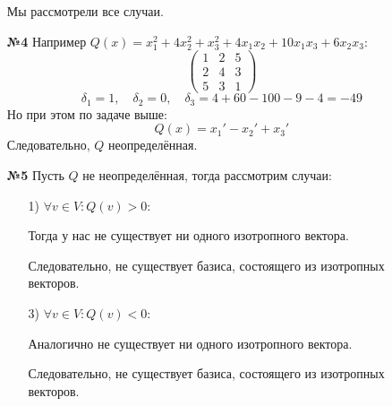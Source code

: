 \documentclass[a4paper]{article}
\newcommand{\mat}[1]{\begin{pmatrix} #1 \end{pmatrix}}
\begin{document}
\begin{enumerate}
    Мы рассмотрели все случаи.

    \item[\textbf{№4}]Например $Q(x) = x_1^2 + 4x_2^2 + x_3^2 + 4 x_1x_2 + 10x_1x_3 + 6x_2x_3$:
    $$\mat{
        1 & 2 & 5 \\
        2 & 4 & 3\\
        5 & 3 & 1
    }$$
    $$\delta_1 = 1, \quad \delta_2 = 0, \quad \delta_3 = 4+60-100-9-4 = -49$$
    Но при этом по задаче выше:
    $$Q(x) = x_1' -x_2'+x_3'$$
    Следовательно, $Q$ неопределённая.

    \item[\textbf{№5}]Пусть $Q$ не неопределённая, тогда рассмотрим случаи:
    \begin{enumerate}
        \item[1)] $\forall v \in V: Q(v) > 0$:
        
        Тогда у нас не существует ни одного изотропного вектора.

        Следовательно, не существует базиса, состоящего из изотропных векторов.


        \item[3)] $\forall v \in V: Q(v) < 0$:
        
        Аналогично не существует ни одного изотропного вектора.

        Следовательно, не существует базиса, состоящего из изотропных векторов.

    \end{enumerate}

\end{enumerate}
\end{document}
